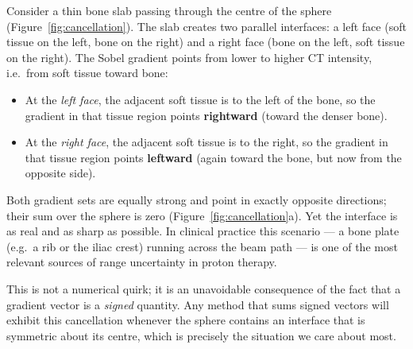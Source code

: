 \documentclass[11pt,a4paper]{article}
\begin{document}
Consider a thin bone slab passing through the centre of the sphere
(Figure~\ref{fig:cancellation}).
The slab creates two parallel interfaces: a left face (soft tissue on the
left, bone on the right) and a right face (bone on the left, soft tissue
on the right).
The Sobel gradient points from lower to higher CT intensity, i.e.\ from
soft tissue toward bone:
\begin{itemize}
    \item At the \emph{left face}, the adjacent soft tissue is to the left of
          the bone, so the gradient in that tissue region points
          \textbf{rightward} (toward the denser bone).
    \item At the \emph{right face}, the adjacent soft tissue is to the right,
          so the gradient in that tissue region points \textbf{leftward}
          (again toward the bone, but now from the opposite side).
\end{itemize}
Both gradient sets are equally strong and point in exactly opposite
directions; their sum over the sphere is zero (Figure~\ref{fig:cancellation}a).
Yet the interface is as real and as sharp as possible.
In clinical practice this scenario — a bone plate (e.g.\ a rib or the iliac
crest) running across the beam path — is one of the most relevant sources of
range uncertainty in proton therapy.

This is not a numerical quirk; it is an unavoidable consequence of the fact
that a gradient vector is a \emph{signed} quantity.
Any method that sums signed vectors will exhibit this cancellation whenever
the sphere contains an interface that is symmetric about its centre, which is
precisely the situation we care about most.
\end{document}
